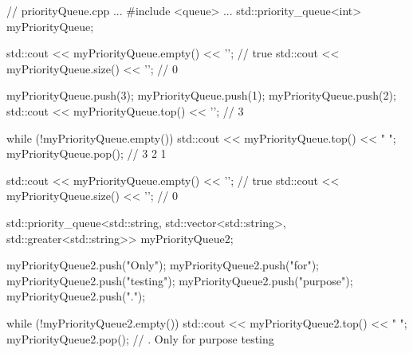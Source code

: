 \begin{cpp}
// priorityQueue.cpp
...
#include <queue>
...
std::priority_queue<int> myPriorityQueue;

std::cout << myPriorityQueue.empty() << '\n'; // true
std::cout << myPriorityQueue.size() << '\n'; // 0

myPriorityQueue.push(3);
myPriorityQueue.push(1);
myPriorityQueue.push(2);
std::cout << myPriorityQueue.top() << '\n'; // 3

while (!myPriorityQueue.empty()){
	std::cout << myPriorityQueue.top() << " ";
	myPriorityQueue.pop();
} // 3 2 1

std::cout << myPriorityQueue.empty() << '\n'; // true
std::cout << myPriorityQueue.size() << '\n'; // 0

std::priority_queue<std::string, std::vector<std::string>,
					std::greater<std::string>> myPriorityQueue2;

myPriorityQueue2.push("Only");
myPriorityQueue2.push("for");
myPriorityQueue2.push("testing");
myPriorityQueue2.push("purpose");
myPriorityQueue2.push(".");

while (!myPriorityQueue2.empty()){
	std::cout << myPriorityQueue2.top() << " ";
	myPriorityQueue2.pop();
} // . Only for purpose testing
\end{cpp}









